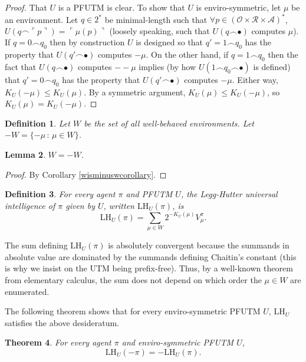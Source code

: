 \documentclass{article}
\newtheorem{theorem}{Theorem}
\newtheorem{definition}[theorem]{Definition}
\newtheorem{lemma}[theorem]{Lemma}
\def\LH{\textrm{LH}}
\begin{document}
\begin{proof}
    That $U$ is a PFUTM is clear.
    To show that $U$ is enviro-symmetric, let $\mu$ be an environment.
    Let $q\in 2^*$ be minimal-length such that
    $\forall p\in (\mathcal O\times \mathcal R\times\mathcal A)^*$,
    $U(q\frown \ulcorner p\urcorner)=\ulcorner \mu(p)\urcorner$
    (loosely speaking, such that $U(q\frown\bullet)$ computes $\mu$).
    If $q=0\frown q_0$ then by construction $U$ is designed so that $q'=1\frown q_0$
    has the property that $U(q'\frown \bullet)$ computes $-\mu$.
    On the other hand, if $q=1\frown q_0$ then the fact that $U(q\frown\bullet)$ computes
    $--\mu$ implies (by how $U(1\frown q_0\frown\bullet)$ is defined) that
    $q'=0\frown q_0$ has the property that $U(q'\frown\bullet)$ computes $-\mu$.
    Either way, $K_U(-\mu)\leq K_U(\mu)$. By a symmetric argument,
    $K_U(\mu)\leq K_U(-\mu)$, so $K_U(\mu)=K_U(-\mu)$.
\end{proof}

\begin{definition}
    Let $W$ be the set of all well-behaved environments.
    Let $-W=\{-\mu\,:\,\mu\in W\}$.
\end{definition}

\begin{lemma}
\label{WequalsminusWlemma}
$W=-W$.
\end{lemma}

\begin{proof}
    By Corollary \ref{wisminuswcorollary}.
\end{proof}

\begin{definition}
\label{universalintelligencedefn}
For every agent $\pi$
and PFUTM $U$, the \emph{Legg-Hutter universal intelligence of $\pi$ given
by $U$}, written $\LH_U(\pi)$, is
\[
    \LH_U(\pi) = \sum_{\mu \in W} 2^{-K_U(\mu)}V^\pi_\mu.
\]
\end{definition}

The sum defining $\LH_U(\pi)$ is absolutely convergent because the summands
in absolute value are dominated by the summands defining Chaitin's constant
(this is why we insist on the UTM being prefix-free).
Thus, by a well-known
theorem from elementary calculus, the sum does not depend on which order the $\mu\in W$
are enumerated.

The following theorem shows that for every enviro-symmetric PFUTM $U$, $\LH_U$
satisfies the above desideratum.

\begin{theorem}
\label{maintheorem}
    For every agent $\pi$ and enviro-symmetric PFUTM $U$,
    \[
        \LH_U(-\pi) = -\LH_U(\pi).
    \]
\end{theorem}
\end{document}
